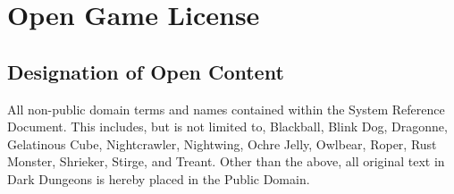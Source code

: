 \chapter{Open Game License}
\chapterimage
\pagestyle{empty}
\obeylines

\begin{multicols}{2}
\small
\section{Designation of Open Content}
All non-public domain terms and names contained within the System Reference Document. This includes, but is not limited to, Blackball, Blink Dog, Dragonne, Gelatinous Cube, Nightcrawler, Nightwing, Ochre Jelly, Owlbear, Roper, Rust Monster, Shrieker, Stirge, and Treant.
Other than the above, all original text in Dark Dungeons is hereby placed in the Public Domain.

\end{multicols}
